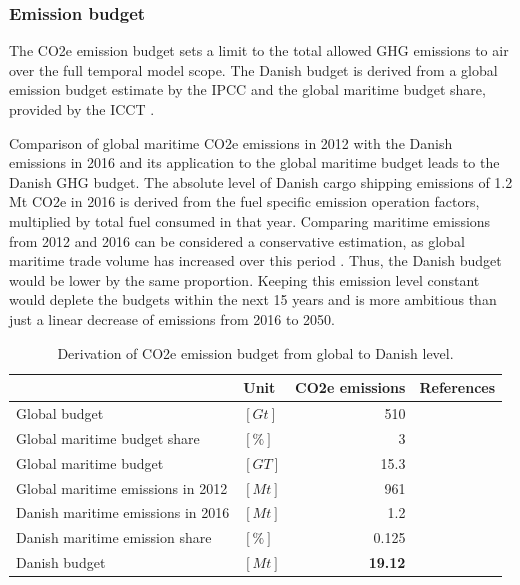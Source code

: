 \documentclass[article]{elsarticle}
\begin{document}
\subsubsection{Emission budget}
The CO2e emission budget sets a limit to the total allowed GHG emissions to air over the full temporal model scope. The Danish budget is derived from a global emission budget estimate by the IPCC \cite[Tab.~SPM.3, RCP2.6]{IPCC2013} and the global maritime budget share, provided by the ICCT \cite{Olmer2017}.

Comparison of global maritime CO2e emissions in 2012 with the Danish emissions in 2016 and its application to the global maritime budget leads to the Danish GHG budget. The absolute level of Danish cargo shipping emissions of 1.2 Mt CO2e in 2016 is derived from the fuel specific emission operation factors, multiplied by total fuel consumed in that year. Comparing maritime emissions from 2012 and 2016 can be considered a conservative estimation, as global maritime trade volume has increased over this period \cite[Tab.~1.3,~p.~5]{UNCTAD2017}. Thus, the Danish budget would be lower by the same proportion. Keeping this emission level constant would deplete the budgets within the next 15 years and is more ambitious than just a linear decrease of emissions from 2016 to 2050.
\begin{table}[htb]
    \centering
    \begin{tabular}{llrr}
        \toprule
         & Unit & CO2e emissions & References \\
         \midrule
         Global budget & $\left[Gt\right]$ & 510 & \cite{IPCC2013} \\
         Global maritime budget share & $\left[\%\right]$ & 3 & \cite{Olmer2017} \\
         Global maritime budget & $\left[GT\right]$ & 15.3 &\\[1.5ex]
         Global maritime emissions in 2012 & $\left[Mt\right]$ & 961 & \cite{Smith2014} \\
         Danish maritime emissions in 2016 & $\left[Mt\right]$ & 1.2 & \cite{Kristensen2012,Eurostat2018,Wisdom2017} \\
         Danish maritime emission share & $\left[\%\right]$ & 0.125 &\\[1.5ex]
         Danish budget & $\left[Mt\right]$ & \textbf{19.12} & \\
         \bottomrule
    \end{tabular}
    \caption[Danish CO2e emission budget]{Derivation of CO2e emission budget from global to Danish level.}
    \label{tab:dk_em_budget}
\end{table}
\end{document}
